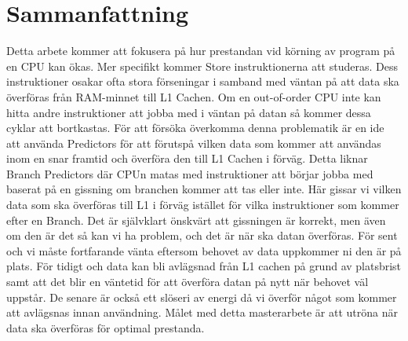 \chapter*{Sammanfattning}
Detta arbete kommer att fokusera på hur prestandan vid körning av program på
en CPU kan ökas. Mer specifikt kommer Store instruktionerna att studeras. Dess
instruktioner osakar ofta stora förseningar i samband med väntan på att data ska
överföras från RAM-minnet till L1 Cachen. Om en out-of-order CPU inte kan hitta
andre instruktioner att jobba med i väntan på datan så kommer dessa cyklar att
bortkastas. För att försöka överkomma denna problematik är en ide att använda
Predictors för att förutspå vilken data som kommer att användas inom en snar framtid
och överföra den till L1 Cachen i förväg. Detta liknar Branch Predictors där CPUn
matas med instruktioner att börjar jobba med baserat på en gissning om branchen
kommer att tas eller inte. Här gissar vi vilken data som ska överföras till L1 i förväg
istället för vilka instruktioner som kommer efter en Branch. Det är självklart önskvärt
att gissningen är korrekt, men även om den är det så kan vi ha problem, och det är
när ska datan överföras. För sent och vi måste fortfarande vänta eftersom behovet
av data uppkommer ni den är på plats. För tidigt och data kan bli avlägsnad från L1
cachen på grund av platsbrist samt att det blir en väntetid för att överföra datan på
nytt när behovet väl uppstår. De senare är också ett slöseri av energi då vi överför
något som kommer att avlägsnas innan användning. Målet med detta masterarbete
är att utröna när data ska överföras för optimal prestanda.
\newpage
